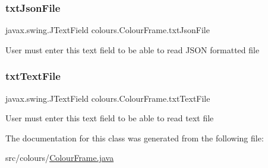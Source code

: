 \subsubsection{\texorpdfstring{txt\+Json\+File}{txtJsonFile}}
{\footnotesize\ttfamily javax.\+swing.\+J\+Text\+Field colours.\+Colour\+Frame.\+txt\+Json\+File\hspace{0.3cm}{\ttfamily [private]}}

User must enter this text field to be able to read J\+S\+ON formatted file \mbox{\label{classcolours_1_1_colour_frame_a8acb908d5dbadca9e110960051340977}} 
\subsubsection{\texorpdfstring{txt\+Text\+File}{txtTextFile}}
{\footnotesize\ttfamily javax.\+swing.\+J\+Text\+Field colours.\+Colour\+Frame.\+txt\+Text\+File\hspace{0.3cm}{\ttfamily [private]}}

User must enter this text field to be able to read text file 

The documentation for this class was generated from the following file\+:\begin{DoxyCompactItemize}
\item 
src/colours/\hyperlink{_colour_frame_8java}{Colour\+Frame.\+java}\end{DoxyCompactItemize}
